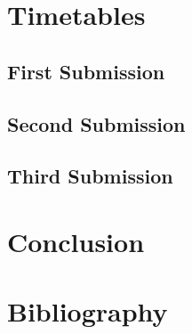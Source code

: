 \chapter{Timetables}


\section{First Submission}


\section{Second Submission}


\section{Third Submission}


\chapter{Conclusion}

\chapter{Bibliography}
